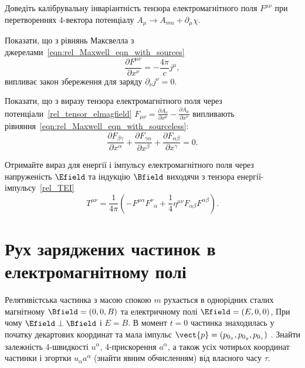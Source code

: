 \begin{problem}
Доведіть калібрувальну інваріантність тензора електромагнітного поля $F^{\mu\nu}$ при перетвореннях
4-вектора потенціалу $A_{\mu} \rightarrow A_{mu}+\partial_{\mu} \chi$.
\end{problem}

\begin{problem}
Показати, що з рівнянь Максвелла з джерелами~\eqref{eqn:rel_Maxwell_eqn_with_sources}
\[
	\frac{\partial F^{\mu\nu}}{\partial x^\nu} = -\frac{4\pi}{c}j^\mu,
\]
випливає закон збереження для заряду $\partial_\nu j^{\nu} = 0$.
\end{problem}

\begin{problem}
Показати, що з виразу тензора електромагнітного поля через потенціали~\eqref{rel_tensor_elmagfield} $F_{\mu\nu} = \frac{\partial A_\nu}{\partial  x^\mu} - \frac{\partial A_\mu}{\partial  x^\nu}$ випливають рівняння~\eqref{eqn:rel_Maxwell_eqn_with_sourceless}:
\[
    \frac{\partial F_{\beta\gamma}}{\partial x^\alpha} + \frac{\partial F_{\gamma\alpha}}{\partial x^\beta} +\frac{\partial
				F_{\alpha\beta}}{\partial x^\gamma}  = 0.
\]
\end{problem}


\begin{problem}
Отримайте вираз для енергії і імпульсу електромагнітного поля через напруженість $\Efield$ та індукцію $\Bfield$ виходячи з тензора енергії-імпульсу~\eqref{rel_TEI}
\[
	T^{\mu\nu} = \frac{1}{4\pi}\left( -F^{\mu \alpha}F^\nu_{\;\;\alpha} + \frac14\eta^{\mu\nu}F_{\alpha\beta}F^{\alpha\beta}\right).
\]
\end{problem}

\section{Рух заряджених частинок в електромагнітному полі}

\begin{problem}
Релятивістська частинка з масою спокою $m$ рухається в однорідних сталих  магнітному  $\Bfield = (0,0,B)$ та електричному полі $\Efield = (E,0,0)$, При чому $\Efield\perp\Bfield$  і $E = B$. В момент $t=0$ частинка знаходилась у початку декартових координат та мала імпульс $\vect{p} = (p_{0_x}, p_{0_y}, p_{0_z})$ . Знайти залежність 4-швидкості $u^{\alpha}$, 4-прискорення $a^{\alpha}$, а також усіх чотирьох координат частинки і згортки $u_{\alpha}a^{\alpha}$  (знайти явним обчисленням) від власного часу $\tau$.
\end{problem}

